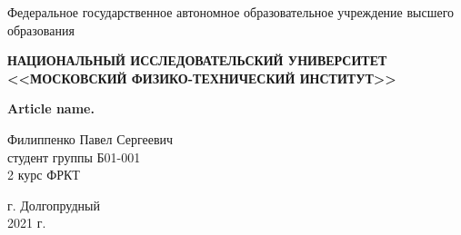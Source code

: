 \begin{center}
    
    \normalsize{Федеральное государственное автономное образовательное учреждение высшего образования}
    
    \textbf{НАЦИОНАЛЬНЫЙ ИССЛЕДОВАТЕЛЬСКИЙ УНИВЕРСИТЕТ \\ <<МОСКОВСКИЙ ФИЗИКО-ТЕХНИЧЕСКИЙ ИНСТИТУТ>>}
    \vspace{13ex}
    
    \textbf{Article name.}
    \vspace{40ex}
    
    \normalsize{Филиппенко Павел Сергеевич \\ студент группы Б01-001\\ 2 курс ФРКТ\\}
\end{center}
    
\vfill 
    
\begin{center}
г. Долгопрудный\\ 
2021 г.
\end{center}


\thispagestyle{empty} %
\newpage